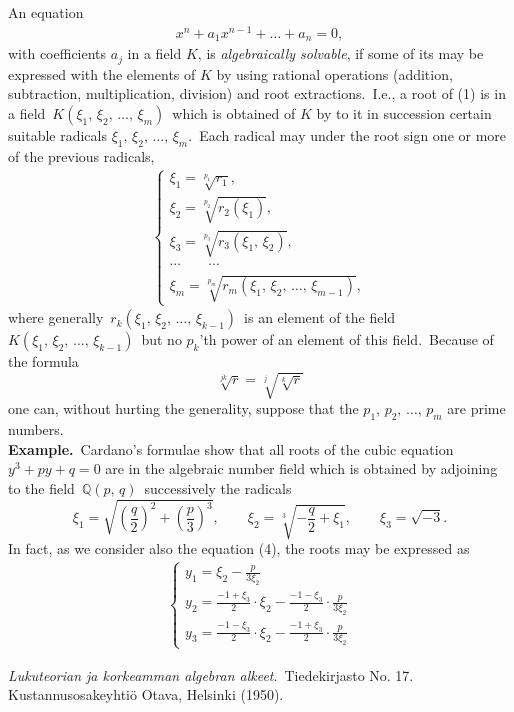 \documentclass[12pt]{article}
\theoremstyle{definition}
\begin{document}
An equation
\begin{align}
x^n+a_1x^{n-1}+\ldots+a_n = 0,
\end{align}
with coefficients $a_j$ in a field $K$, is {\it algebraically 
solvable}, if some of its  may 
be expressed with the elements of $K$ by using rational 
operations (addition, subtraction, multiplication, division) 
and root extractions.\, I.e., a root of (1) is in a field\, 
$K(\xi_1,\,\xi_2,\,\ldots,\,\xi_m)$\, which is obtained of 
$K$ by  to it in 
succession certain suitable radicals 
$\xi_1,\,\xi_2,\,\ldots,\,\xi_m$.\, Each radical may 
 under the root sign one or more of 
the previous radicals,
\begin{align*}
\begin{cases}
\xi_1 = \sqrt[p_1]{r_1},\\
\xi_2 = \sqrt[p_2]{r_2(\xi_1)},\\
\xi_3 = \sqrt[p_3]{r_3(\xi_1,\,\xi_2)},\\
\cdots\qquad\cdots\\
\xi_m = \sqrt[p_m]{r_m(\xi_1,\,\xi_2,\,\ldots,\,\xi_{m-1})},
\end{cases}
\end{align*}
where generally\, $r_k(\xi_1,\,\xi_2,\,\ldots,\,\xi_{k-1})$\, is an element of the field 
$K(\xi_1,\,\xi_2,\,\ldots,\,\xi_{k-1})$\, but no $p_k$'th power of an element of this field.\, Because of the formula
      $$\sqrt[jk]{r} = \sqrt[j]{\sqrt[k]{r}}$$
one can, without hurting the generality, suppose that the  $p_1,\,p_2,\,\ldots,\,p_m$ are prime numbers.\\

\textbf{Example.}\, Cardano's formulae show that all roots of the cubic equation\; $y^3+py+q = 0$\; are in the algebraic number field which is obtained by adjoining to the field\, $\mathbb{Q}(p,\,q)$\, successively the radicals
$$\xi_1 = \sqrt{\left(\frac{q}{2}\right)^2\!+\!\left(\frac{p}{3}\right)^3}, \qquad 
\xi_2 = \sqrt[3]{-\frac{q}{2}\!+\!\xi_1}, \qquad \xi_3 = \sqrt{-3}.$$
In fact, as we consider also the equation (4), the roots may be expressed as
\begin{align*}
\begin{cases}
\displaystyle y_1 = \xi_2-\frac{p}{3\xi_2}\\
\displaystyle y_2 = \frac{-1\!+\!\xi_3}{2}\cdot\xi_2-\frac{-1\!-\!\xi_3}{2}\cdot\!\frac{p}{3\xi_2}\\
\displaystyle y_3 = \frac{-1\!-\!\xi_3}{2}\cdot\xi_2-\frac{-1\!+\!\xi_3}{2}\cdot\!\frac{p}{3\xi_2}
\end{cases}
\end{align*}

\begin{thebibliography}{9}
 {\em Lukuteorian ja korkeamman algebran alkeet}. \,Tiedekirjasto No. 17. \, Kustannusosakeyhti\"o Otava, Helsinki (1950).
\end{thebibliography}
\end{document}
